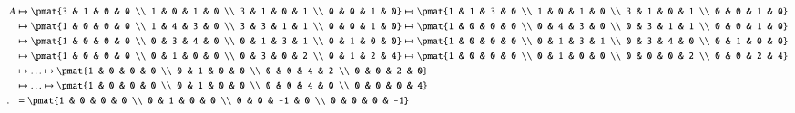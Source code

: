 \documentclass[a4paper,10pt,oneside,openany]{article}
\begin{document}
\begin{solution}
\begin{enumerate}
\begin{align*}
A &\mapsto \pmat{3 & 1 & 0 & 0 \\ 1 & 0 & 1 & 0 \\ 3 & 1 & 0 & 1 \\ 0 & 0 & 1 & 0} \mapsto
\pmat{1 & 1 & 3 & 0 \\ 1 & 0 & 1 & 0 \\ 3 & 1 & 0 & 1 \\ 0 & 0 & 1 & 0}
\\&\mapsto 
\pmat{1 & 0 & 0 & 0 \\ 1 & 4 & 3 & 0 \\ 3 & 3 & 1 & 1 \\ 0 & 0 & 1 & 0} \mapsto
\pmat{1 & 0 & 0 & 0 \\ 0 & 4 & 3 & 0 \\ 0 & 3 & 1 & 1 \\ 0 & 0 & 1 & 0}
\\&\mapsto
\pmat{1 & 0 & 0 & 0 \\ 0 & 3 & 4 & 0 \\ 0 & 1 & 3 & 1 \\ 0 & 1 & 0 & 0} \mapsto
\pmat{1 & 0 & 0 & 0 \\ 0 & 1 & 3 & 1 \\ 0 & 3 & 4 & 0 \\ 0 & 1 & 0 & 0}
\\&\mapsto
\pmat{1 & 0 & 0 & 0 \\ 0 & 1 & 0 & 0 \\ 0 & 3 & 0 & 2 \\ 0 & 1 & 2 & 4} \mapsto
\pmat{1 & 0 & 0 & 0 \\ 0 & 1 & 0 & 0 \\ 0 & 0 & 0 & 2 \\ 0 & 0 & 2 & 4} \\&\mapsto
\ldots \mapsto
\pmat{1 & 0 & 0 & 0 \\ 0 & 1 & 0 & 0 \\ 0 & 0 & 4 & 2 \\ 0 & 0 & 2 & 0}  \\&\mapsto
\ldots \mapsto \pmat{1 & 0 & 0 & 0 \\ 0 & 1 & 0 & 0 \\ 0 & 0 & 4 & 0 \\ 0 & 0 & 0 & 4} \\\text{.}\hphantom{A}
&= \pmat{1 & 0 & 0 & 0 \\ 0 & 1 & 0 & 0 \\ 0 & 0 & -1 & 0 \\ 0 & 0 & 0 & -1}
\end{align*}


\end{enumerate}
\end{solution}
\end{document}
